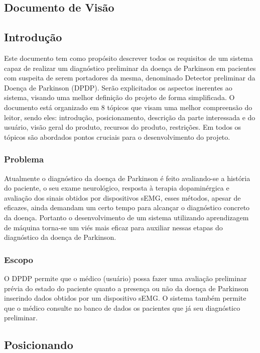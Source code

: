 \begin{apendicesenv}
    \chapter[Documento de Visão]{Documento de Visão}
    \label{adocvisao}

    \section{Introdução}

    Este documento tem como propósito descrever todos os requisitos de um sistema capaz de realizar um diagnóstico preliminar da doença de Parkinson em pacientes com suspeita de serem portadores da mesma, denominado Detector preliminar da Doença de Parkinson (DPDP). Serão explicitados os aspectos inerentes ao sistema, visando uma melhor definição do projeto de forma simplificada. O documento está organizado em 8 tópicos que visam uma melhor compreensão do leitor, sendo eles: introdução, posicionamento, descrição da parte interessada e do usuário, visão geral do produto, recursos do produto, restrições. Em todos os tópicos são abordados pontos cruciais para o desenvolvimento do projeto.

    \subsection{Problema}

    Atualmente o diagnóstico da doença de Parkinson é feito avaliando-se a história do paciente, o seu exame neurológico, resposta à terapia dopaminérgica e avaliação dos sinais obtidos por dispositivos sEMG, esses métodos, apesar de eficazes, ainda demandam um certo tempo para alcançar o diagnóstico concreto da doença. Portanto o desenvolvimento de um sistema utilizando aprendizagem de máquina torna-se um viés mais eficaz para auxiliar nessas etapas do diagnóstico da doença de Parkinson.

    \subsection{Escopo}

    O DPDP permite que o médico (usuário) possa fazer uma avaliação preliminar prévia do estado do paciente quanto a presença ou não da doença de Parkinson inserindo dados obtidos por um dispositivo sEMG. O sistema também permite que o médico consulte no banco de dados os pacientes que já seu diagnóstico preliminar.

    \section{Posicionando}


\end{apendicesenv}
